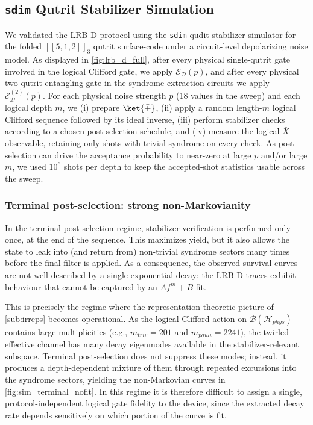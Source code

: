 \subsection{\texttt{sdim} Qutrit Stabilizer Simulation}
\label{sub:simulation_results}

We validated the LRB-D protocol using the \texttt{sdim} qudit
stabilizer simulator \cite{sdim} for the folded $[[5,1,2]]_3$ qutrit
surface-code under a circuit-level
depolarizing noise model. As displayed in \autoref{fig:lrb_d_full}, after every physical single-qutrit gate involved 
in the logical Clifford gate, we
apply $\mathcal{E}_{\mathcal{D}}(p)$, and after every physical
two-qutrit entangling gate in the syndrome extraction circuits we
apply $\mathcal{E}^{(2)}_{\mathcal{D}}(p)$. For each physical noise
strength $p$ (18 values in the sweep) and each logical depth $m$, we
(i) prepare $\ket{\bar{+}}$, (ii) apply a random length-$m$ logical
Clifford sequence followed by its ideal inverse, (iii) perform
stabilizer checks according to a chosen post-selection schedule, and
(iv) measure the logical $\bar{X}$ observable, retaining only shots
with trivial syndrome on every check. As post-selection can
drive the acceptance probability to near-zero at large $p$ and/or
large $m$, we used $10^6$ shots per depth to keep the accepted-shot
statistics usable across the sweep.

\subsubsection{Terminal post-selection: strong non-Markovianity}
In the terminal post-selection regime, stabilizer
verification is performed only once, at the end of the sequence. This
maximizes yield, but it also allows the state to leak into (and
return from) non-trivial syndrome sectors many times before the final
filter is applied. As a consequence, the observed survival curves are
not well-described by a single-exponential decay: the LRB-D traces
exhibit behaviour that cannot be captured by an $A f^m + B$ fit.


This is precisely the regime where the representation-theoretic
picture of \autoref{sub:irreps} becomes operational. As the
logical Clifford action on $\mathcal{B}(\mathcal{H}_{phys})$ contains
large multiplicities (e.g., $m_{triv}=201$ and $m_{pauli}=2241$), the
twirled effective channel has many decay eigenmodes available in the
stabilizer-relevant subspace. Terminal post-selection does not
suppress these modes; instead, it produces a depth-dependent mixture
of them through repeated excursions into the syndrome sectors,
yielding the non-Markovian curves in \autoref{fig:sim_terminal_nofit}.
In this regime it is therefore difficult to assign a single,
protocol-independent logical gate fidelity to the device, since
the extracted decay rate depends sensitively on which portion of the
curve is fit.


